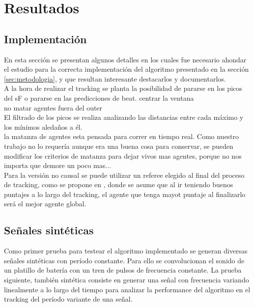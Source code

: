 \documentclass[12pt,a4paper,titlepage]{report}
\begin{document}
\chapter{Resultados}

\section{Implementación}

En esta sección se presentan algunos detalles en los cuales fue necesario ahondar el estudio para la correcta implementación del algoritmo presentado en la sección \ref{sec:metodologia}, y que resultan interesante destacarlos y documentarlos.\\


A la hora de realizar el tracking se planta la posibilidad de pararse en los picos del sF o pararse en las predicciones de beat. centrar la ventana\\


no matar agentes fuera del outer\\

El filtrado de los picos se realiza analizando las distancias entre cada máximo y los mínimos aledaños a él.\\

la matanza de agentes esta pensada para correr en tiempo real. Como nuestro trabajo no lo requería aunque era una buena cosa para conservar, se pueden modificar los criterios de matanza para dejar vivos mas agentes, porque no nos importa que demore un poco mas...\\

Para la versión no causal se puede utilizar un referee elegido al final del proceso de tracking, como se propone en \cite{bib:dixon}, donde se asume que al ir teniendo buenos puntajes a lo largo del tracking, el agente que tenga mayot puntaje al finalizarlo será el mejor agente global.


\section{Señales sintéticas}

Como primer prueba para testear el algoritmo implementado se generan diversas señales sintéticas con período constante. Para ello se convolucionan el sonido de un platillo de batería con un tren de pulsos de frecuencia constante. La prueba siguiente, también sintética consiste en generar una señal con frecuencia variando linealmente a lo largo del tiempo para analizar la performance del algoritmo en el tracking del período variante de una señal.\\
\end{document}
